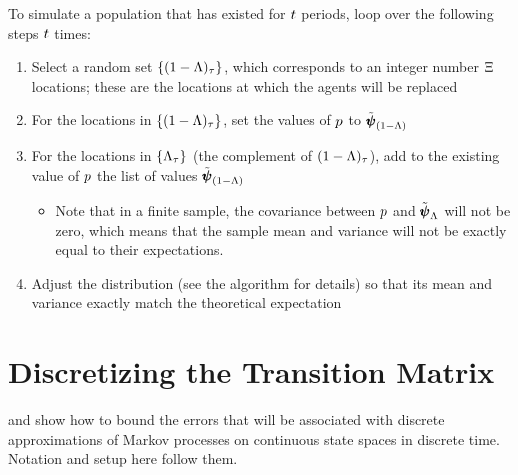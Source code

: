 \documentclass[\econtexRoot/BufferStockTheory.tex]{subfiles}
\begin{document}
To simulate a population that has existed for $t$ periods, loop over the following steps $t$ times:
\begin{enumerate}
\item Select a random set $\{(1-\Lambda)_{\tau}\}$, which corresponds to an integer number $\Xi$ locations; these are the locations at which the agents will be replaced 
\item For the locations in $\{(1-\Lambda)_{\tau}\}$, set the values of $p$ to $\tilde{\pmb{\psi}}_{(1-\Lambda)}$
\item For the locations in $\{\Lambda_{\tau}\}$ (the complement of $(1-\Lambda)_{\tau}$), add to the existing value of $p$ the list of values $\tilde{\pmb{\psi}}_{(1-\Lambda)}$
  \begin{itemize}
  \item Note that in a finite sample, the covariance between $p$ and $\tilde{\pmb{\psi}}_{\Lambda}$ will not be zero, which means that the sample mean and variance will not be exactly equal to their expectations.
  \end{itemize}
\item Adjust the distribution (see the algorithm for details) so that its mean and variance exactly match the theoretical expectation    
\end{enumerate}

\section{Discretizing the Transition Matrix}

\cite{saDiscrete} and \cite{saQuantitative} show how to bound the errors that will be associated with discrete approximations of Markov processes on continuous state spaces in discrete time.  Notation and setup here follow them.

\end{document}
